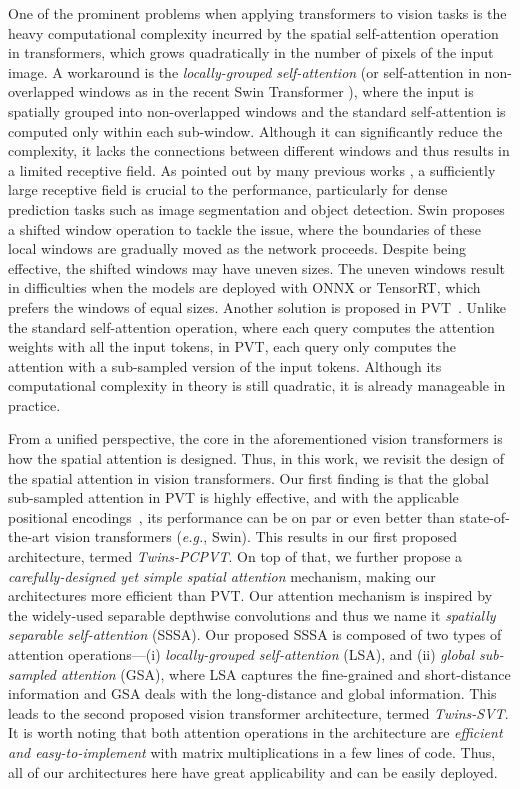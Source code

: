 \documentclass{article}
\def \eg {\textit{e.g.}\xspace}
\def \altour   {Twins-SVT}
\def \pcpvt  {Twins-PCPVT}
\begin{document}
One of the prominent problems when applying transformers to vision 
tasks is the heavy computational complexity incurred by the spatial self-attention operation in transformers, which grows quadratically in the 
number of pixels of 
the input image. 
A workaround is the \emph{locally-grouped self-attention} (or self-attention in non-overlapped windows as 
in the recent Swin Transformer \cite{liu2021swin}), where the input is spatially grouped into non-overlapped windows and the standard self-attention is computed only within each sub-window. Although it can significantly reduce the complexity, it lacks the connections between different windows and thus results in a limited receptive field. As pointed out 
by many previous works \cite{chen2017deeplab, peng2017large, liu2015parsenet}, a sufficiently large receptive field is crucial to the performance, particularly for 
dense prediction tasks such as image segmentation and object detection. Swin
\cite{liu2021swin}
proposes a shifted window operation to tackle 
the issue, where the boundaries of these local windows are gradually moved as the network proceeds.  Despite being effective, the shifted windows may have uneven sizes.  The uneven windows result in difficulties when the models are deployed with ONNX or TensorRT, which prefers the windows of 
equal sizes. Another solution is proposed in PVT~\cite{wang2021pyramid}. Unlike the standard self-attention operation, where each query computes the attention weights with all the input tokens, in PVT, each query only computes the attention with a sub-sampled version of the input tokens. Although its computational complexity in theory is still quadratic, it is already manageable  
in practice.



From a unified perspective, the core in the aforementioned vision transformers is {how the spatial attention is designed}.  Thus, in this work, we revisit the design of the spatial attention  in vision transformers. Our first 
finding 
is that the global sub-sampled attention in PVT is highly effective, and with the applicable positional encodings~\cite{chu2021ConditionalPE}, its performance can be {on par} or even better than state-of-the-art vision transformers (\eg, Swin). This results in our first proposed architecture, termed {\it \pcpvt}.
On top of that, we further propose a \emph{carefully-designed yet simple spatial attention} mechanism, making our architectures more efficient than PVT. Our attention mechanism is inspired by the widely-used separable depthwise convolutions and thus we name it \emph{spatially separable self-attention} (SSSA). Our proposed SSSA is 
composed of two 
types 
of attention operations---(i) \emph{locally-grouped self-attention} (LSA), and (ii) \emph{global   sub-sampled   attention} (GSA), where LSA captures the fine-grained and short-distance information and GSA deals with the long-distance and global information. This leads to the 
second
proposed
vision transformer architecture, termed 
{\it \altour}. It is worth noting that both attention operations in the architecture are \emph{efficient and easy-to-implement} with matrix multiplications in a few lines of code. Thus, all of our architectures here have great applicability and can be easily deployed.
\end{document}
